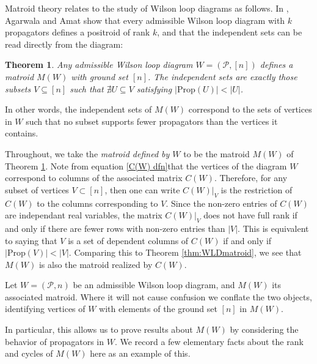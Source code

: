 \documentclass[11pt]{article}
\newcommand{\cP}{\mathcal{P}}
\newcommand{\Prop}{\textrm{Prop}}
\newtheorem{thm}{Theorem}[section]
\theoremstyle{remark}
\theoremstyle{definition}
\begin{document}
Matroid theory relates to the study of Wilson loop diagrams as follows. In \cite{wilsonloop}, Agarwala and Amat show that every admissible Wilson loop diagram with $k$ propagators defines a positroid of rank $k$, and that the independent sets can be read directly from the diagram:

\begin{thm} \label{thm WLD defines matroid} \cite[Theorem 3.6]{wilsonloop} Any admissible Wilson loop diagram $W =(\cP, [n])$ defines a matroid $M(W)$ with ground set $[n]$. The independent sets are exactly those subsets $V \subseteq [n]$ such that $\nexists U\subseteq V$ satisfying $|\Prop(U)| < |U|$. \label{thm:WLDmatroid}\end{thm}
In other words, the independent sets of $M(W)$ correspond to the sets of vertices in $W$ such that no subset supports fewer propagators than the vertices it contains.

Throughout, we take the {\em matroid defined by $W$} to be the matroid $M(W)$ of Theorem \ref{thm WLD defines matroid}. Note from equation \eqref{C(W) dfn}that the vertices of the diagram $W$ correspond to columns of the associated matrix $C(W)$. Therefore, for any subset of vertices $V \subset [n]$,  then one can write $C(W)|_V$ is the restriction of $C(W)$ to the columns corresponding to $V$. Since the non-zero entries of $C(W)$ are independant real variables, the matrix $C(W)|_V$ does not have full rank if and only if there are fewer rows with non-zero entries than $|V|$. This is equivalent to saying that $V$ is a set of dependent columns of $C(W)$ if and only if $|\Prop(V)| < |V|$. Comparing this to Theorem \ref{thm:WLDmatroid}, we see that $M(W)$ is also the matroid realized by $C(W)$.




Let $W = (\cP,n)$ be an admissible Wilson loop diagram, and $M(W)$ its associated matroid. Where it will not cause confusion we conflate the two objects, identifying vertices of $W$ with elements of the ground set $[n]$ in $M(W)$. 

In particular, this allows us to prove results about $M(W)$ by considering the behavior of propagators in $W$. We record a few elementary facts about the rank and cycles of $M(W)$ here as an example of this.
\end{document}

